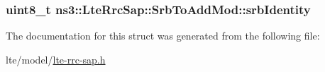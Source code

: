 \subsubsection[{\texorpdfstring{srb\+Identity}{srbIdentity}}]{\setlength{\rightskip}{0pt plus 5cm}uint8\+\_\+t ns3\+::\+Lte\+Rrc\+Sap\+::\+Srb\+To\+Add\+Mod\+::srb\+Identity}\hypertarget{structns3_1_1LteRrcSap_1_1SrbToAddMod_a57de3218fb9a1f32db153cd970f2fc37}{}\label{structns3_1_1LteRrcSap_1_1SrbToAddMod_a57de3218fb9a1f32db153cd970f2fc37}


The documentation for this struct was generated from the following file\+:\begin{DoxyCompactItemize}
\item 
lte/model/\hyperlink{lte-rrc-sap_8h}{lte-\/rrc-\/sap.\+h}\end{DoxyCompactItemize}

